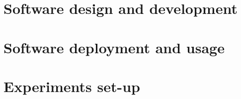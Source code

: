 

\section{Software design and development}
    

\section{Software deployment and usage}
    

\section{Experiments set-up}
    